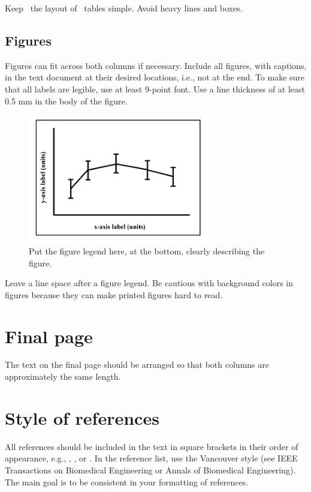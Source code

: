 \documentclass[twocolumn]{cinc}
\begin{document}
Keep \ the layout of \ tables simple. Avoid  heavy lines and boxes.

\subsection{ Figures}   

Figures can fit across both columns if necessary. Include all figures, with
captions, in the text document at their desired locations, i.e., not at the
end. To make sure that all labels are legible, use at least 9-point
font. Use a line thickness of at least 0.5 mm in the body of the figure.

\begin{figure}[h]
\includegraphics[width=7.9cm]{fig/graph.png}
\caption{Put the figure legend here, at the bottom, clearly describing the
  figure.}
\label{FIGURA1}
\end{figure}

Leave a line space after a figure legend. Be cautious with background
colors in figures because they can make printed figures hard to read.

\section{Final page}

The text on the final page should be arranged so that both columns are
approximately the same length.

\balance

\section{Style of references}     

All references should be included in the text in square brackets in their
order of appearance, e.g., \cite{tag}, \cite{tag,ito}, or
\cite{tag,ito,fardel,buncombe}. In the reference list, use the Vancouver
style (see IEEE Transactions on Biomedical Engineering or Annals of
Biomedical Engineering). The main goal is to be consistent in your
formatting of references.
\end{document}
